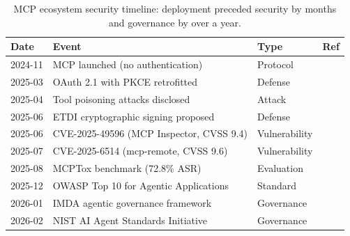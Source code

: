 
\begin{table}[htbp]
\centering
\caption{MCP ecosystem security timeline: deployment preceded security by months and governance by over a year.}
\label{tab:mcp-timeline}

\fontsize{7}{9}\selectfont
\setlength{\tabcolsep}{5pt}
\renewcommand{\arraystretch}{1.3}

\begin{tabular}{l l l l}
\toprule
\textbf{Date} & \textbf{Event} & \textbf{Type} & \textbf{Ref} \\
\midrule

\rowcolor{rowgray}
2024-11 & MCP launched (no authentication) & Protocol & ~\cite{anthropic2024mcp} \\
2025-03 & OAuth 2.1 with PKCE retrofitted & Defense & ~\cite{mcpspec2025} \\
\rowcolor{rowgray}
2025-04 & Tool poisoning attacks disclosed & Attack & ~\cite{invariant2025toolpoisoning} \\
2025-06 & ETDI cryptographic signing proposed & Defense & ~\cite{bhatt2025etdi} \\
\rowcolor{rowgray}
2025-06 & CVE-2025-49596 (MCP Inspector, CVSS 9.4) & Vulnerability & ~\cite{oligo2025inspector} \\
2025-07 & CVE-2025-6514 (mcp-remote, CVSS 9.6) & Vulnerability & ~\cite{jfrog2025mcpremote} \\
\rowcolor{rowgray}
2025-08 & MCPTox benchmark (72.8\% ASR) & Evaluation & ~\cite{wang2025mcptox} \\
2025-12 & OWASP Top 10 for Agentic Applications & Standard & ~\cite{owasp2025agentic} \\
\rowcolor{rowgray}
2026-01 & IMDA agentic governance framework & Governance & ~\cite{imda2026agentic} \\
2026-02 & NIST AI Agent Standards Initiative & Governance & ~\cite{nist2026agentstandards} \\

\bottomrule
\end{tabular}
\end{table}
